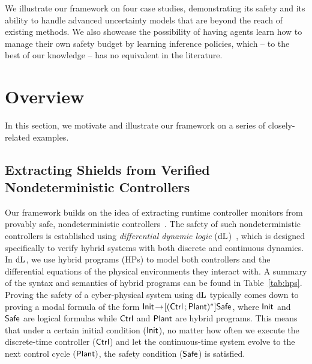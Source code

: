\documentclass[acmsmall,screen,nonacm]{acmart}
\begin{document}
We illustrate our framework on four case studies, demonstrating its safety and its ability to handle advanced uncertainty models that are beyond the reach of existing methods. We also showcase the possibility of having agents learn how to manage their own safety budget by learning inference policies, which -- to the best of our knowledge -- has no equivalent in the literature.

\section{Overview}


\newcommand{\JSCModel}{\mathKeyword{Model}}

In this section, we motivate and illustrate our framework on a series of closely-related examples.

\subsection{Extracting Shields from Verified Nondeterministic Controllers}

Our framework builds on the idea of extracting runtime controller monitors from provably safe, nondeterministic controllers~\cite{DBLP:journals/fmsd/MitschP16,DBLP:conf/aaai/FultonP18}. The safety of such nondeterministic controllers is established using \emph{differential dynamic logic} ($\mathop{}\!\mathrm{d} \text{L}$)~\cite{DBLP:journals/jar/Platzer08,DBLP:journals/jar/Platzer17}, which is designed specifically to verify hybrid systems with both discrete and continuous dynamics. In $\mathop{}\!\mathrm{d} \text{L}$, we use hybrid programs (HPs) to model both controllers and the differential equations of the physical environments they interact with. A summary of the syntax and semantics of hybrid programs can be found in Table~\ref{tab:hps}. Proving the safety of a cyber-physical system using $\mathop{}\!\mathrm{d} \text{L}$ typically comes down to proving a modal formula of the form $\mathsf{Init} \!\rightarrow\! [(\mathsf{Ctrl} \operatorname*{;} \mathsf{Plant})^*]\mathsf{Safe}$, where $\mathsf{Init}$ and $\mathsf{Safe}$ are logical formulas while $\mathsf{Ctrl}$ and $\mathsf{Plant}$ are hybrid programs. This means that under a certain initial condition ($\mathsf{Init}$), no matter how often we execute the discrete-time controller ($\mathsf{Ctrl}$) and let the continuous-time system evolve to the next control cycle $(\mathsf{Plant})$, the safety condition ($\mathsf{Safe}$) is satisfied.


\end{document}
